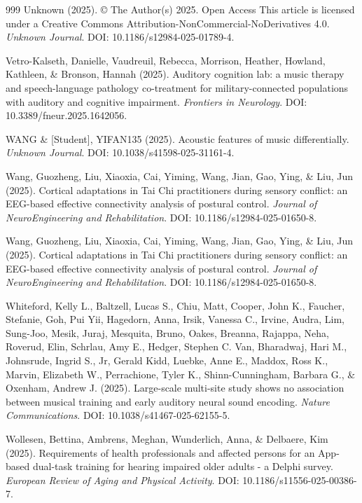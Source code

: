 \documentclass[9pt,onecolumn]{article}
\begin{document}
\begin{thebibliography}{999}
Unknown (2025). © The Author(s) 2025. Open Access This article is licensed under a Creative Commons Attribution-NonCommercial-NoDerivatives 4.0. \textit{Unknown Journal}. DOI: 10.1186/s12984-025-01789-4.

Vetro-Kalseth, Danielle, Vaudreuil, Rebecca, Morrison, Heather, Howland, Kathleen, \& Bronson, Hannah (2025). Auditory cognition lab: a music therapy and speech-language pathology co-treatment for military-connected populations with auditory and cognitive impairment. \textit{Frontiers in Neurology}. DOI: 10.3389/fneur.2025.1642056.

WANG \& [Student], YIFAN135 (2025). Acoustic features of music differentially. \textit{Unknown Journal}. DOI: 10.1038/s41598-025-31161-4.

Wang, Guozheng, Liu, Xiaoxia, Cai, Yiming, Wang, Jian, Gao, Ying, \& Liu, Jun (2025). Cortical adaptations in Tai Chi practitioners during sensory conflict: an EEG-based effective connectivity analysis of postural control. \textit{Journal of NeuroEngineering and Rehabilitation}. DOI: 10.1186/s12984-025-01650-8.

Wang, Guozheng, Liu, Xiaoxia, Cai, Yiming, Wang, Jian, Gao, Ying, \& Liu, Jun (2025). Cortical adaptations in Tai Chi practitioners during sensory conflict: an EEG-based effective connectivity analysis of postural control. \textit{Journal of NeuroEngineering and Rehabilitation}. DOI: 10.1186/s12984-025-01650-8.

Whiteford, Kelly L., Baltzell, Lucas S., Chiu, Matt, Cooper, John K., Faucher, Stefanie, Goh, Pui Yii, Hagedorn, Anna, Irsik, Vanessa C., Irvine, Audra, Lim, Sung-Joo, Mesik, Juraj, Mesquita, Bruno, Oakes, Breanna, Rajappa, Neha, Roverud, Elin, Schrlau, Amy E., Hedger, Stephen C. Van, Bharadwaj, Hari M., Johnsrude, Ingrid S., Jr, Gerald Kidd, Luebke, Anne E., Maddox, Ross K., Marvin, Elizabeth W., Perrachione, Tyler K., Shinn-Cunningham, Barbara G., \& Oxenham, Andrew J. (2025). Large-scale multi-site study shows no association between musical training and early auditory neural sound encoding. \textit{Nature Communications}. DOI: 10.1038/s41467-025-62155-5.

Wollesen, Bettina, Ambrens, Meghan, Wunderlich, Anna, \& Delbaere, Kim (2025). Requirements of health professionals and affected persons for an App-based dual-task training for hearing impaired older adults - a Delphi survey. \textit{European Review of Aging and Physical Activity}. DOI: 10.1186/s11556-025-00386-7.


\end{thebibliography}
\end{document}
